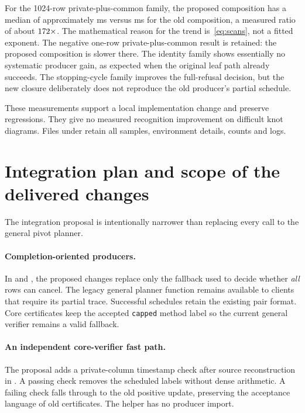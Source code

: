 \documentclass[11pt]{article}
\theoremstyle{definition}\newtheorem{definition}[theorem]{Definition}
\theoremstyle{remark}\newtheorem{remark}[theorem]{Remark}
\begin{document}
\begin{table}[htbp]
\centering\small

\caption{Paired matrix-kernel measurements, in milliseconds. Ratio compares the old and proposed producer compositions. ``New query'' includes the column-only producer, independent matrix checking and evidence serialization; it is not a whole native query.}
\label{tab:timing}
\end{table}

For the 1024-row private-plus-common family, the proposed composition has a median of approximately \BenchProposed{} ms versus \BenchOld{} ms for the old composition, a measured ratio of about $172\times$. The mathematical reason for the trend is~\eqref{eq:scans}, not a fitted exponent. The negative one-row private-plus-common result is retained: the proposed composition is slower there. The identity family shows essentially no systematic producer gain, as expected when the original leaf path already succeeds. The stopping-cycle family improves the full-refusal decision, but the new closure deliberately does not reproduce the old producer's partial schedule.

These measurements support a local implementation change and preserve regressions. They give no measured recognition improvement on difficult knot diagrams. Files under  retain all samples, environment details, counts and logs.

\section{Integration plan and scope of the delivered changes}
\label{sec:integration}
The integration proposal is intentionally narrower than replacing every call to the general pivot planner.

\paragraph{Completion-oriented producers.}
In  and , the proposed changes replace only the fallback used to decide whether \emph{all} rows can cancel. The legacy general planner function remains available to clients that require its partial trace. Successful schedules retain the existing pair format. Core certificates keep the accepted \texttt{capped} method label so the current general verifier remains a valid fallback.

\paragraph{An independent core-verifier fast path.}
The proposal adds a private-column timestamp check after source reconstruction in . A passing check removes the scheduled labels without dense arithmetic. A failing check falls through to the old positive update, preserving the acceptance language of old certificates. The helper has no producer import.
\end{document}
